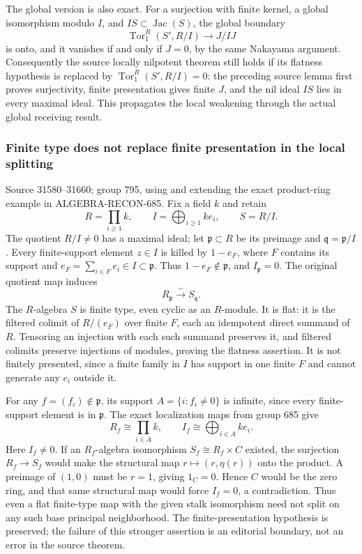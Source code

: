 The global version is also exact. For a surjection with finite kernel, a global isomorphism modulo \(I\), and \(IS\subset\operatorname{Jac}(S)\), the global boundary \[
\operatorname{Tor}_1^R(S',R/I)\longrightarrow J/IJ
\] is onto, and it vanishes if and only if \(J=0\), by the same Nakayama argument. Consequently the source locally nilpotent theorem still holds if its flatness hypothesis is replaced by \(\operatorname{Tor}_1^R(S',R/I)=0\): the preceding source lemma first proves surjectivity, finite presentation gives finite \(J\), and the nil ideal \(IS\) lies in every maximal ideal. This propagates the local weakening through the actual global receiving result.

\subsubsection{Finite type does not replace finite presentation in the local splitting}\label{algebra-proof-035-finite-type-does-not-replace-finite-presentation-in-the-local-splitting}

Source 31580--31660; group 795, using and extending the exact product-ring example in ALGEBRA-\AlgebraIdentifierBreak{}RECON-\AlgebraIdentifierBreak{}685. Fix a field \(k\) and retain \[
R=\prod_{i\ge1}k,\qquad I=\bigoplus_{i\ge1}ke_i,\qquad S=R/I.
\] The quotient \(R/I\ne0\) has a maximal ideal; let \(\mathfrak p\subset R\) be its preimage and \(\mathfrak q=\mathfrak p/I\). Every finite-support element \(z\in I\) is killed by \(1-e_F\), where \(F\) contains its support and \(e_F=\sum_{i\in F}e_i\in I\subset\mathfrak p\). Thus \(1-e_F\notin\mathfrak p\), and \(I_{\mathfrak p}=0\). The original quotient map induces \[
R_{\mathfrak p}\xrightarrow{\sim}S_{\mathfrak q}.
\] The \(R\)-algebra \(S\) is finite type, even cyclic as an \(R\)-module. It is flat: it is the filtered colimit of \(R/(e_F)\) over finite \(F\), each an idempotent direct summand of \(R\). Tensoring an injection with each such summand preserves it, and filtered colimits preserve injections of modules, proving the flatness assertion. It is not finitely presented, since a finite family in \(I\) has support in one finite \(F\) and cannot generate any \(e_i\) outside it.

For any \(f=(f_i)\notin\mathfrak p\), its support \(A=\{i:f_i\ne0\}\) is infinite, since every finite-support element is in \(\mathfrak p\). The exact localization maps from group 685 give \[
R_f\cong\prod_{i\in A}k,\qquad I_f\cong\bigoplus_{i\in A}ke_i.
\] Here \(I_f\ne0\). If an \(R_f\)-algebra isomorphism \(S_f\cong R_f\times C\) existed, the surjection \(R_f\to S_f\) would make the structural map \(r\mapsto(r,\eta(r))\) onto the product. A preimage of \((1,0)\) must be \(r=1\), giving \(1_C=0\). Hence \(C\) would be the zero ring, and that same structural map would force \(I_f=0\), a contradiction. Thus even a flat finite-type map with the given stalk isomorphism need not split on any such base principal neighborhood. The finite-presentation hypothesis is preserved; the failure of this stronger assertion is an editorial boundary, not an error in the source theorem.

